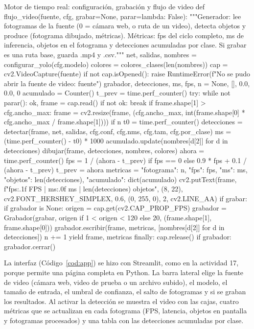 \documentclass[11pt,letterpaper]{article}
\begin{document}
\begin{codigo}[label=cod:flujo]{Motor de tiempo real: configuración, grabación y flujo de video}
def flujo_video(fuente, cfg, grabar=None, parar=lambda: False):
    """Generador: lee fotogramas de la fuente (0 = cámara web, o ruta de un video), detecta objetos y
    produce (fotograma dibujado, métricas). Métricas: fps del ciclo completo, ms de inferencia, objetos
    en el fotograma y detecciones acumuladas por clase. Si grabar es una ruta base, guarda .mp4 y .csv."""
    net, salidas, nombres = configurar_yolo(cfg.modelo)
    colores = colores_clases(len(nombres))
    cap = cv2.VideoCapture(fuente)
    if not cap.isOpened():
        raise RuntimeError(f"No se pudo abrir la fuente de video: {fuente}")
    grabador, detecciones, ms, fps, n = None, [], 0.0, 0.0, 0
    acumulado = Counter()
    t_prev = time.perf_counter()
    try:
        while not parar():
            ok, frame = cap.read()
            if not ok:
                break
            if frame.shape[1] > cfg.ancho_max:
                frame = cv2.resize(frame, (cfg.ancho_max, int(frame.shape[0] * cfg.ancho_max / frame.shape[1])))
            if n %
                t0 = time.perf_counter()
                detecciones = detectar(frame, net, salidas, cfg.conf, cfg.nms, cfg.tam, cfg.por_clase)
                ms = (time.perf_counter() - t0) * 1000
                acumulado.update(nombres[d[2]] for d in detecciones)
            dibujar(frame, detecciones, nombres, colores)
            ahora = time.perf_counter()
            fps = 1 / (ahora - t_prev) if fps == 0 else 0.9 * fps + 0.1 / (ahora - t_prev)
            t_prev = ahora
            metricas = {"fotograma": n, "fps": fps, "ms": ms, "objetos": len(detecciones), "acumulado": dict(acumulado)}
            cv2.putText(frame, f"{fps:.1f} FPS | {ms:.0f} ms | {len(detecciones)} objetos", (8, 22),
                        cv2.FONT_HERSHEY_SIMPLEX, 0.6, (0, 255, 0), 2, cv2.LINE_AA)
            if grabar:
                if grabador is None:
                    origen = cap.get(cv2.CAP_PROP_FPS)
                    grabador = Grabador(grabar, origen if 1 < origen < 120 else 20, (frame.shape[1], frame.shape[0]))
                grabador.escribir(frame, metricas, [nombres[d[2]] for d in detecciones])
            n += 1
            yield frame, metricas
    finally:
        cap.release()
        if grabador:
            grabador.cerrar()
\end{codigo}

La interfaz (Código~\ref{cod:app}) se hizo con Streamlit, como en la actividad 17, porque permite una página completa en Python. La barra lateral elige la fuente de video (cámara web, video de prueba o un archivo subido), el modelo, el tamaño de entrada, el umbral de confianza, el salto de fotogramas y si se graban los resultados. Al activar la detección se muestra el video con las cajas, cuatro métricas que se actualizan en cada fotograma (FPS, latencia, objetos en pantalla y fotogramas procesados) y una tabla con las detecciones acumuladas por clase.
\end{document}
